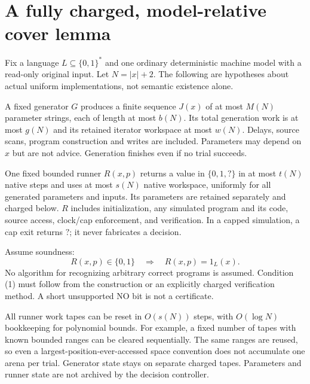 \documentclass[11pt]{article}
\begin{document}
\section{A fully charged, model-relative cover lemma}
Fix a language $L\subseteq\{0,1\}^*$ and one ordinary deterministic machine
model with a read-only original input. Let $N=|x|+2$. The following are
hypotheses about actual uniform implementations, not semantic existence alone.

A fixed generator $G$ produces a finite sequence $J(x)$ of at most $M(N)$
parameter strings, each of length at most $b(N)$. Its total generation work is
at most $g(N)$ and its retained iterator workspace at most $w(N)$. Delays,
source scans, program construction and writes are included. Parameters may
depend on $x$ but are not advice. Generation finishes even if no trial succeeds.

One fixed bounded runner $R(x,p)$ returns a value in $\{0,1,?\}$ in at most
$t(N)$ native steps and uses at most $s(N)$ native workspace, uniformly for
all generated parameters and inputs. Its parameters are retained separately
and charged below. $R$ includes initialization, any simulated program and its
code, source access, clock/cap enforcement, and verification. In a capped
simulation, a cap exit returns $?$; it never fabricates a decision.

Assume soundness:
\[
 R(x,p)\in\{0,1\}\quad\Longrightarrow\quad R(x,p)=1_L(x).
                                                               \tag{1}
\]
No algorithm for recognizing arbitrary correct programs is assumed. Condition
(1) must follow from the construction or an explicitly charged verification
method. A short unsupported NO bit is not a certificate.

All runner work tapes can be reset in $O(s(N))$ steps, with $O(\log N)$
bookkeeping for polynomial bounds. For example, a fixed number of tapes with
known bounded ranges can be cleared sequentially. The same ranges are reused,
so even a largest-position-ever-accessed space convention does not accumulate
one arena per trial. Generator state stays on separate charged tapes.
Parameters and runner state are not archived by the decision controller.
\end{document}
